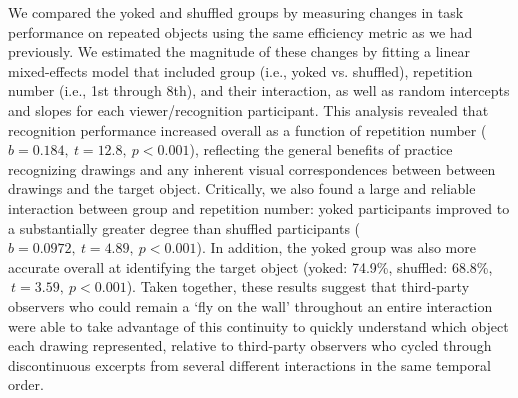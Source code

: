 \documentclass[10pt,letterpaper]{article}
\begin{document}

We compared the yoked and shuffled groups by measuring changes in task performance on repeated objects using the same efficiency metric as we had previously.
We estimated the magnitude of these changes by fitting a linear mixed-effects model that included group (i.e., yoked vs. shuffled), repetition number (i.e., 1st through 8th), and their interaction, as well as random intercepts and slopes for each viewer/recognition participant.
This analysis revealed that recognition performance increased overall as a function of repetition number ($b = 0.184, ~t = 12.8, ~p < 0.001$), reflecting the general benefits of practice recognizing drawings and any inherent visual correspondences between between drawings and the target object.  %
Critically, we also found a large and reliable interaction between group and repetition number: yoked participants improved to a substantially greater degree than shuffled participants ($b = 0.0972, ~t = 4.89, ~p<0.001$).
In addition, the yoked group was also more accurate overall at identifying the target object (yoked: 74.9\%, shuffled: 68.8\%, $~t = 3.59, ~p < 0.001$). %
Taken together, these results suggest that third-party observers who could remain a `fly on the wall' throughout an entire interaction were able to take advantage of this continuity to quickly understand which object each drawing represented, relative to third-party observers who cycled through discontinuous excerpts from several different interactions in the same temporal order.



\end{document}
